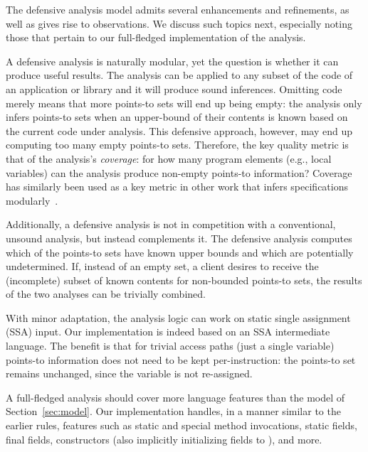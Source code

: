 The defensive analysis model admits several enhancements and
refinements, as well as gives rise to observations. We discuss such
topics next, especially noting those that pertain to our full-fledged
implementation of the analysis.

A defensive analysis is naturally modular, yet the question is whether
it can produce useful results. The analysis can be applied to any
subset of the code of an application or library and it will produce
sound inferences. Omitting code merely means that more points-to sets
will end up being empty: the analysis only infers points-to sets when
an upper-bound of their contents is known based on the current code
under analysis. This defensive approach, however, may end up computing
too many empty points-to sets. Therefore, the key quality metric is
that of the analysis's \emph{coverage}: for how many program elements
(e.g., local variables) can the analysis produce non-empty points-to
information? Coverage has similarly been used as a key metric in other
work that infers specifications
modularly~\cite{popl:2009:Calcagno}.

Additionally, a defensive analysis is not in competition with a
conventional, unsound analysis, but instead complements it. The
defensive analysis computes which of the points-to sets have known
upper bounds and which are potentially undetermined. If, instead of an
empty set, a client desires to receive the (incomplete) subset of
known contents for non-bounded points-to sets, the results of the two
analyses can be trivially combined.

With minor adaptation, the analysis logic can work on static single
assignment (SSA) input. 
Our implementation is indeed based on an SSA intermediate
language. The benefit is that for trivial access paths (just a single
variable) points-to information does not need to be kept
per-instruction: the points-to set remains unchanged, since the
variable is not re-assigned.

A full-fledged analysis should cover more language features than the
model of Section~\ref{sec:model}. Our implementation handles, in a
manner similar to the earlier rules, features such as static and
special method invocations, static fields, final fields, constructors (also
implicitly initializing fields to ), and more.


